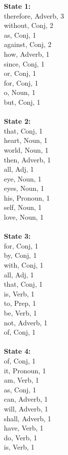 \begin{multicols}{4}
\textbf{State 1:}\\
therefore, Adverb, 3\\
without, Conj, 2\\
as, Conj, 1\\
against, Conj, 2\\
how, Adverb, 1\\
since, Conj, 1\\
or, Conj, 1\\
for, Conj, 1\\
o, Noun, 1\\
but, Conj, 1\\
\\
\textbf{State 2:} \\
that, Conj, 1\\
heart, Noun, 1\\
world, Noun, 1\\
then, Adverb, 1\\
all, Adj, 1\\
eye, Noun, 1\\
eyes, Noun, 1\\
his, Pronoun, 1\\
self, Noun, 1\\
love, Noun, 1\\
\\
\textbf{State 3:} \\
for, Conj, 1\\
by, Conj, 1\\
with, Conj, 1\\
all, Adj, 1\\
that, Conj, 1\\
is, Verb, 1\\
to, Prep, 1\\
be, Verb, 1\\
not, Adverb, 1\\
of, Conj, 1\\
\\
\textbf{State 4:} \\
of, Conj, 1\\
it, Pronoun, 1\\
am, Verb, 1\\
as, Conj, 1\\
can, Adverb, 1\\
will, Adverb, 1\\
shall, Adverb, 1\\
have, Verb, 1\\
do, Verb, 1\\
is, Verb, 1\\

\end{multicols}
